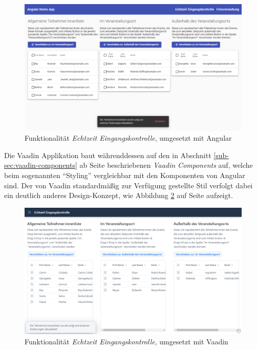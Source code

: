 \documentclass[a4paper,12pt,twoside]{scrreprt}
\begin{document}
\begin{figure}[ht]
    \centering
    \includegraphics[scale=0.4]{images/Luidold_Results-Angular-EntranceControl-Snackbar.png}
    \caption[Funktionalität \textit{Echtzeit Eingangskontrolle}, umgesetzt mit Angular]{Funktionalität \textit{Echtzeit Eingangskontrolle}, umgesetzt mit Angular}
    \label{fig:results-angular-ec-snackbar}
\end{figure}

Die Vaadin Applikation baut währenddessen auf den in Abschnitt \ref{sub-sec:vaadin-components} ab Seite \pageref{sub-sec:vaadin-components} beschriebenen \textit{Vaadin Components} auf, welche beim sogenannten \enquote{Styling} vergleichbar mit den Komponenten von Angular sind. Der von Vaadin standardmäßig zur Verfügung gestellte Stil verfolgt dabei ein deutlich anderes Design-Konzept, wie Abbildung \ref{fig:results-vaadin-ec-snackbar} auf Seite \pageref{fig:results-vaadin-ec-snackbar} aufzeigt.

\begin{figure}[ht]
    \centering
    \includegraphics[scale=0.4]{images/Luidold_Results-Vaadin-EntranceControl-Snackbar.png}
    \caption[Funktionalität \textit{Echtzeit Eingangskontrolle}, umgesetzt mit Vaadin]{Funktionalität \textit{Echtzeit Eingangskontrolle}, umgesetzt mit Vaadin}
    \label{fig:results-vaadin-ec-snackbar}
\end{figure}
\end{document}
